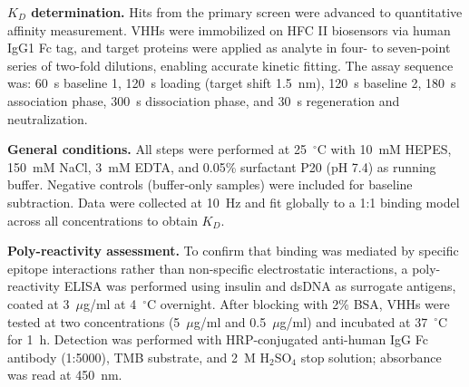 \documentclass[11pt]{article}
\begin{document}
\textbf{$K_D$ determination.} Hits from the primary screen were advanced to quantitative affinity measurement.
VHHs were immobilized on HFC II biosensors via human IgG1 Fc tag, and target proteins were applied
as analyte in four- to seven-point series of two-fold dilutions, enabling accurate kinetic fitting. The assay
sequence was: 60~s baseline 1, 120~s loading (target shift 1.5~nm), 120~s baseline 2, 180~s association phase, 300~s
dissociation phase, and 30~s regeneration and neutralization.

\textbf{General conditions.} All steps were performed at 25~$^{\circ}$C with 10~mM HEPES, 150~mM NaCl, 3~mM EDTA,
and 0.05\% surfactant P20 (pH 7.4) as running buffer. Negative controls (buffer-only samples) were included
for baseline subtraction. Data were collected at 10~Hz and fit globally to a 1:1 binding model across all
concentrations to obtain $K_D$.

\textbf{Poly-reactivity assessment.} To confirm that binding was mediated by specific epitope interactions rather
than non-specific electrostatic interactions, a poly-reactivity ELISA was performed using insulin and dsDNA
as surrogate antigens, coated at 3~$\mu$g/ml at 4~$^{\circ}$C overnight. After blocking with 2\% BSA, VHHs were tested
at two concentrations (5~$\mu$g/ml and 0.5~$\mu$g/ml) and incubated at 37~$^{\circ}$C for 1~h. Detection was performed
with HRP-conjugated anti-human IgG Fc antibody (1:5000), TMB substrate, and 2~M H$_2$SO$_4$ stop solution;
absorbance was read at 450~nm.
\end{document}
